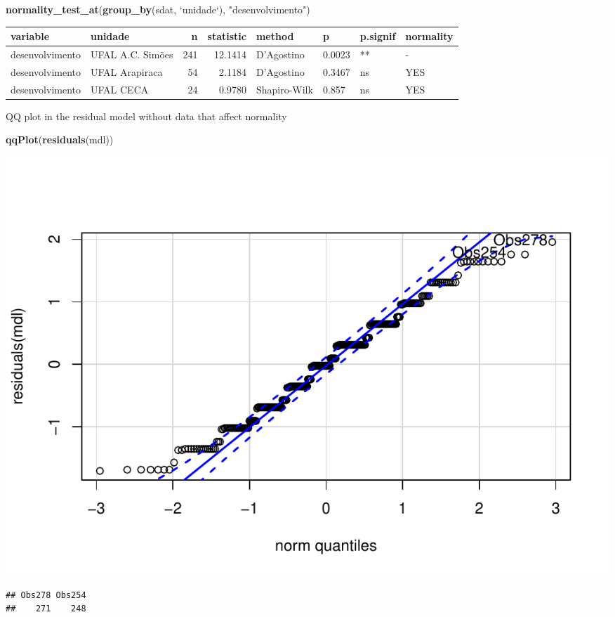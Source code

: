 \documentclass[]{article}
\newenvironment{Shaded}{\begin{snugshade}}{\end{snugshade}}
\newcommand{\DataTypeTok}[1]{\textcolor[rgb]{0.13,0.29,0.53}{#1}}
\newcommand{\KeywordTok}[1]{\textcolor[rgb]{0.13,0.29,0.53}{\textbf{#1}}}
\newcommand{\NormalTok}[1]{#1}
\newcommand{\StringTok}[1]{\textcolor[rgb]{0.31,0.60,0.02}{#1}}
\begin{document}
\begin{Shaded}
\begin{Highlighting}[]
\KeywordTok{normality_test_at}\NormalTok{(}\KeywordTok{group_by}\NormalTok{(sdat, }\StringTok{`}\DataTypeTok{unidade}\StringTok{`}\NormalTok{), }\StringTok{"desenvolvimento"}\NormalTok{)}
\end{Highlighting}
\end{Shaded}

\begin{longtable}[]{@{}llrrllll@{}}
\toprule
variable & unidade & n & statistic & method & p & p.signif &
normality\tabularnewline
\midrule
\endhead
desenvolvimento & UFAL A.C. Simões & 241 & 12.1414 & D'Agostino & 0.0023
& ** & -\tabularnewline
desenvolvimento & UFAL Arapiraca & 54 & 2.1184 & D'Agostino & 0.3467 &
ns & YES\tabularnewline
desenvolvimento & UFAL CECA & 24 & 0.9780 & Shapiro-Wilk & 0.857 & ns &
YES\tabularnewline
\bottomrule
\end{longtable}

QQ plot in the residual model without data that affect normality

\begin{Shaded}
\begin{Highlighting}[]
\KeywordTok{qqPlot}\NormalTok{(}\KeywordTok{residuals}\NormalTok{(mdl))}
\end{Highlighting}
\end{Shaded}

\includegraphics{factorialAnova_files/figure-latex/unnamed-chunk-16-1.pdf}

\begin{verbatim}
## Obs278 Obs254 
##    271    248
\end{verbatim}
\end{document}
